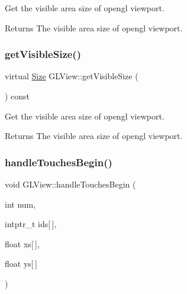 Get the visible area size of opengl viewport.

\begin{DoxyReturn}{Returns}
The visible area size of opengl viewport. 
\end{DoxyReturn}
\mbox{\label{classGLView_aae96f8054234a3e35478a6f5518c03b0}} 
\subsubsection{\texorpdfstring{get\+Visible\+Size()}{getVisibleSize()}\hspace{0.1cm}{\footnotesize\ttfamily [2/2]}}
{\footnotesize\ttfamily virtual \hyperlink{classSize}{Size} G\+L\+View\+::get\+Visible\+Size (\begin{DoxyParamCaption}{ }\end{DoxyParamCaption}) const\hspace{0.3cm}{\ttfamily [virtual]}}

Get the visible area size of opengl viewport.

\begin{DoxyReturn}{Returns}
The visible area size of opengl viewport. 
\end{DoxyReturn}
\mbox{\label{classGLView_a0db8bb472b496eda8861c39cb5bab43d}} 
\subsubsection{\texorpdfstring{handle\+Touches\+Begin()}{handleTouchesBegin()}\hspace{0.1cm}{\footnotesize\ttfamily [1/2]}}
{\footnotesize\ttfamily void G\+L\+View\+::handle\+Touches\+Begin (\begin{DoxyParamCaption}\item[{int}]{num,  }\item[{intptr\+\_\+t}]{ids\mbox{[}$\,$\mbox{]},  }\item[{float}]{xs\mbox{[}$\,$\mbox{]},  }\item[{float}]{ys\mbox{[}$\,$\mbox{]} }\end{DoxyParamCaption})\hspace{0.3cm}{\ttfamily [virtual]}}

